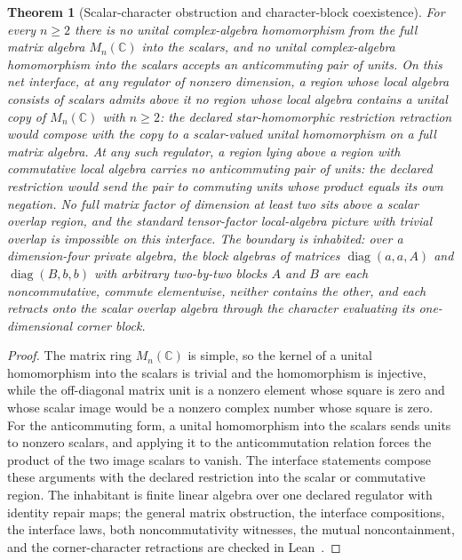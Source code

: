 \documentclass[11pt]{article}
\newtheorem{theorem}{Theorem}[section]
\begin{document}
\begin{theorem}[Scalar-character obstruction and character-block coexistence]
\label{thm:character-block-coexistence}
For every \(n\ge 2\) there is no unital complex-algebra homomorphism from
the full matrix algebra \(M_n(\mathbb C)\) into the scalars, and no
unital complex-algebra homomorphism into the scalars accepts an
anticommuting pair of units. On this net interface, at any regulator of
nonzero dimension, a region whose local algebra consists of scalars
admits above it no region whose local algebra contains a unital copy of
\(M_n(\mathbb C)\) with \(n\ge 2\): the declared star-homomorphic
restriction retraction would compose with the copy to a scalar-valued
unital homomorphism on a full matrix algebra. At any such regulator, a
region lying above a region with commutative local algebra carries no
anticommuting pair of units: the declared restriction would send the pair to
commuting units whose product equals its own negation. No full matrix
factor of dimension at least two sits above a scalar overlap region, and
the standard tensor-factor local-algebra picture with trivial overlap is
impossible on this interface. The boundary is inhabited: over a
dimension-four private algebra, the block algebras of matrices
\(\operatorname{diag}(a,a,A)\) and \(\operatorname{diag}(B,b,b)\) with
arbitrary two-by-two blocks \(A\) and \(B\) are each noncommutative,
commute elementwise, neither contains the other, and each retracts onto
the scalar overlap algebra through the character evaluating its
one-dimensional corner block.
\end{theorem}

\begin{proof}
The matrix ring \(M_n(\mathbb C)\) is simple, so the kernel of a unital
homomorphism into the scalars is trivial and the homomorphism is
injective, while the off-diagonal matrix unit is a nonzero element whose
square is zero and whose scalar image would be a nonzero complex number
whose square is zero. For the anticommuting form, a unital homomorphism
into the scalars sends units to nonzero scalars, and applying it to the
anticommutation relation forces the product of the two image scalars to
vanish. The interface statements compose these arguments with the
declared restriction into the scalar or commutative region. The
inhabitant is finite linear algebra over one declared regulator with
identity repair maps; the general matrix obstruction, the interface
compositions, the interface laws, both noncommutativity witnesses, the
mutual noncontainment, and the corner-character retractions are checked
in Lean~\cite{ophrepo}.
\end{proof}
\end{document}
